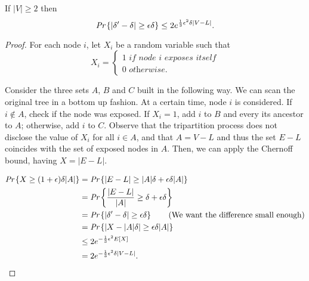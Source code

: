 \begin{lem}
	If $|V| \geq 2$ then
	\begin{equation}
	\emph{Pr}\left\{|\delta' - \delta| \geq \epsilon\delta\right\} \leq 2e^{\frac{1}{3}\epsilon^2\delta|V-L|}.
	\end{equation}
\end{lem}
\begin{proof}
	For each node $i$, let $X_i$ be a random variable such that
	\begin{equation}
		X_i = \begin{cases}
		1 \textit{ if node i exposes itself}\\
		0 \textit{ otherwise}.
		\end{cases}
	\end{equation}
	
	Consider the three sets $A$, $B$ and $C$ built in the following way. We can scan the original tree in a bottom up fashion. At a certain time, node $i$ is considered. If $i \not\in A$, check if the node was exposed. If $X_i = 1$, add $i$ to $B$ and every its ancestor to $A$; otherwise, add $i$ to $C$. 
	Observe that the tripartition process does not disclose the value of $X_i$ for all $i \in A$, and that $A = V - L$ and thus the set $E - L$ coincides with the set of exposed nodes in $A$. Then, we can apply the Chernoff bound, having $X = |E - L|$.
	
	\begin{align}
		\emph{Pr}\left\{X \geq (1 + \epsilon)\delta |A|\right\} &= \emph{Pr}\left\{|E - L| \geq |A|\delta + \epsilon\delta|A|\right\}\\
		&=\emph{Pr}\left\{\frac{|E - L|}{|A|} \geq \delta + \epsilon\delta\right\}\\
		&=\emph{Pr}\left\{|\delta'-\delta| \geq \epsilon\delta\right\} \tag{We want the difference small enough}\\
		&= \emph{Pr}\left\{|X - |A|\delta| \geq \epsilon\delta|A|\right\}\\
		&\leq 2e^{-\frac{1}{3}\epsilon^2E[X]}\\
		& = 2e^{-\frac{1}{3}\epsilon^2\delta|V-L|}.
		\end{align}	
\end{proof}

